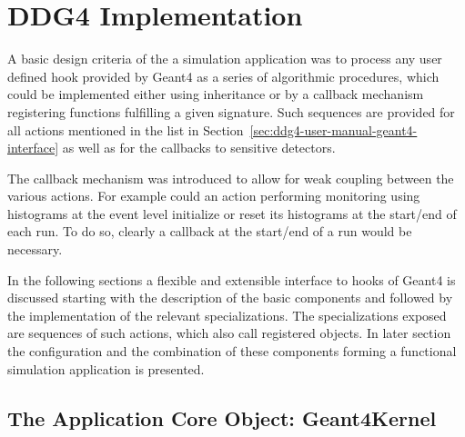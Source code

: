 
\section{DDG4 Implementation}
\label{sec:ddg4-user-manual-implementation}

\noindent
A basic design criteria of the a \DDG simulation application was to 
process any user defined hook provided by Geant4 as a series of algorithmic
procedures, which could be implemented either using inheritance or by 
a callback mechanism registering functions fulfilling a given signature.
Such sequences are provided for all actions mentioned in the list in 
Section~\ref{sec:ddg4-user-manual-geant4-interface} as well as for 
the callbacks to sensitive detectors.

\noindent
The callback mechanism was introduced to allow for weak coupling between 
the various actions. For example could an action performing monitoring
using histograms at the event level initialize or reset its histograms
at the start/end of each run. To do so, clearly a callback at the 
start/end of a run would be necessary.

\noindent
In the following sections a flexible and extensible interface to hooks
of Geant4 is discussed starting with the description of the basic
components  and  followed by the 
implementation of the relevant specializations.
The specializations exposed are sequences of such actions,
which also call registered objects.
In later section the configuration and the combination of these components 
forming a functional simulation application is presented.

\subsection{The Application Core Object: Geant4Kernel}
\label{sec:ddg4-user-manual-implementation-geant4kernel}

